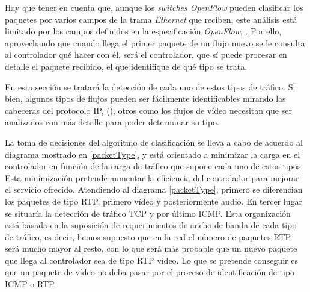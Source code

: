 \documentclass[a4paper,11pt]{book}
\begin{document}
Hay que tener en cuenta que, aunque los \emph{switches OpenFlow} pueden clasificar los paquetes por varios campos de la trama \emph{Ethernet} que reciben, este análisis está limitado por los campos definidos en la especificación \emph{OpenFlow}, \cite{openflow13}. Por ello, aprovechando que cuando llega el primer paquete de un flujo nuevo se le consulta al controlador qué hacer con él, será el controlador, que sí puede procesar en detalle el paquete recibido, el que identifique de qué tipo se trata.
  
En esta sección se tratará la detección de cada uno de estos tipos de tráfico. Si bien, algunos tipos de flujos pueden ser fácilmente identificables mirando las cabeceras del protocolo \ac{IP}, (\cite{rfcIP}), otros como los flujos de vídeo necesitan que ser analizados con más detalle para poder determinar su tipo.

La toma de decisiones del algoritmo de clasificación se lleva a cabo de acuerdo al diagrama mostrado en \ref{packetType}, y está orientado a minimizar la carga en el controlador en función de la carga de tráfico que supone cada uno de estos tipos. Esta minimización pretende aumentar la eficiencia del controlador para mejorar el servicio ofrecido. Atendiendo al diagrama \ref{packetType}, primero se diferencian los paquetes de tipo \ac{RTP}, primero vídeo y posteriormente audio. En tercer lugar se situaría la detección de tráfico \ac{TCP} y por último \ac{ICMP}. Esta organización está basada en la suposición de requerimientos de ancho de banda de cada tipo de tráfico, es decir, hemos supuesto que en la red el número de paquetes \ac{RTP} será mucho mayor al resto, con lo que será más probable que un nuevo paquete que llega al controlador sea de tipo \ac{RTP} vídeo. Lo que se pretende conseguir es que un paquete de vídeo no deba pasar por el proceso de identificación de tipo \ac{ICMP} o \ac{RTP}.
 
\end{document}
